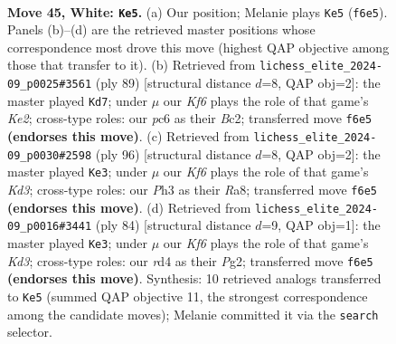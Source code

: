 \documentclass[11pt]{article}
\begin{document}
\clearpage

\begin{figure}[p]\centering
\begin{subfigure}{0.46\textwidth}\centering
\resizebox{\linewidth}{!}{%
\newchessgame
\chessboard[
  setfen={8/p2p4/2p2K1k/8/3r4/7P/5P2/8 w - - 1 45},
  showmover=false,
  pgfstyle=straightmove, color=movearrow, markmove={f6-e5}
]}
\caption{}
\end{subfigure}\hfill
\begin{subfigure}{0.46\textwidth}\centering
\resizebox{\linewidth}{!}{%
\newchessgame
\chessboard[
  setfen={8/p3k3/2R5/4K3/8/2P5/P1b5/8 b - - 0 45},
  showmover=false,
  pgfstyle=straightmove, color=movearrow, markmove={e7-d7}
]}
\caption{}
\end{subfigure}
\\[4pt]
\begin{subfigure}{0.46\textwidth}\centering
\resizebox{\linewidth}{!}{%
\newchessgame
\chessboard[
  setfen={R7/2k2p1p/4p3/8/8/3K4/5r2/8 w - - 1 49},
  showmover=false,
  pgfstyle=straightmove, color=movearrow, markmove={d3-e3}
]}
\caption{}
\end{subfigure}\hfill
\begin{subfigure}{0.46\textwidth}\centering
\resizebox{\linewidth}{!}{%
\newchessgame
\chessboard[
  setfen={8/5pp1/6p1/4k3/7P/3K4/5PP1/8 w - - 6 43},
  showmover=false,
  pgfstyle=straightmove, color=movearrow, markmove={d3-e3}
]}
\caption{}
\end{subfigure}
\caption{\textbf{Move 45, White: \texttt{Ke5}.} (a) Our position; Melanie plays \texttt{Ke5} (\texttt{f6e5}). Panels (b)--(d) are the retrieved master positions whose correspondence most drove this move (highest QAP objective among those that transfer to it). (b) Retrieved from \texttt{lichess\_elite\_2024-09\_p0025\#3561} (ply 89) [structural distance $d$=8, QAP obj=2]: the master played \texttt{Kd7}; under $\mu$ our \emph{Kf6} plays the role of that game's \emph{Ke2}; cross-type roles: our \emph{p}c6 as their \emph{B}c2; transferred move \texttt{f6e5} \textbf{(endorses this move)}. (c) Retrieved from \texttt{lichess\_elite\_2024-09\_p0030\#2598} (ply 96) [structural distance $d$=8, QAP obj=2]: the master played \texttt{Ke3}; under $\mu$ our \emph{Kf6} plays the role of that game's \emph{Kd3}; cross-type roles: our \emph{P}h3 as their \emph{R}a8; transferred move \texttt{f6e5} \textbf{(endorses this move)}. (d) Retrieved from \texttt{lichess\_elite\_2024-09\_p0016\#3441} (ply 84) [structural distance $d$=9, QAP obj=1]: the master played \texttt{Ke3}; under $\mu$ our \emph{Kf6} plays the role of that game's \emph{Kd3}; cross-type roles: our \emph{r}d4 as their \emph{P}g2; transferred move \texttt{f6e5} \textbf{(endorses this move)}. Synthesis: 10 retrieved analogs transferred to \texttt{Ke5} (summed QAP objective 11, the strongest correspondence among the candidate moves); Melanie committed it via the \texttt{search} selector.}
\label{fig:thought-m88}
\end{figure}
\end{document}
